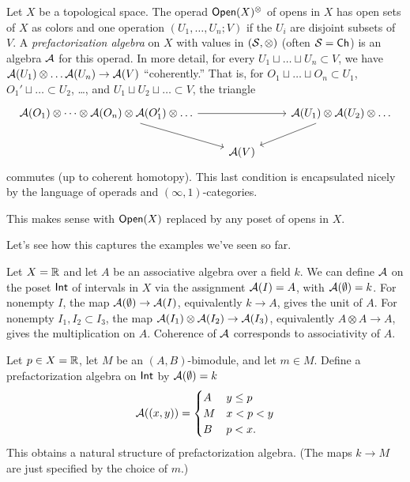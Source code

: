 \begin{dfn}
	Let $X$ be a topological space.
	The operad $\mathsf{Open}(X)^{\otimes}$ of opens in $X$ has open sets of $X$ as colors and one operation $(U_1, \dots, U_n; V)$ if the $U_i$ are disjoint subsets of $V$.
	A \emph{prefactorization algebra} on $X$ with values in $(\mathcal{S}, \otimes)$ (often $\mathcal{S} = \mathsf{Ch}$) is an algebra $\mathcal{A}$ for this operad.
	In more detail, for every $U_1 \sqcup \dots \sqcup U_n \subset V$, we have $\mathcal{A}(U_1) \otimes \dots \mathcal{A}(U_n) \to \mathcal{A}(V)$ ``coherently.''
	That is, for $O_1 \sqcup \dots \sqcup O_n \subset U_1$, $O_1' \sqcup \dots \subset U_2$, \dots, and $U_1 \sqcup U_2 \sqcup \dots \subset V$, the triangle
	\[
		\begin{tikzcd}
			\Ac(O_1) \otimes \dots \otimes \Ac(O_n) \otimes \Ac(O_1') \otimes \dots \ar[rr] \ar[dr] & & \Ac(U_1) \otimes \Ac(U_2) \otimes \dots \ar[dl] \\
														& \Ac(V) &
		\end{tikzcd}
	\]
	commutes (up to coherent homotopy).
	This last condition is encapsulated nicely by the language of operads and $(\infty, 1)$-categories.
\end{dfn}

\begin{rmk}
	This makes sense with $\mathsf{Open}(X)$ replaced by any poset of opens in $X$.
\end{rmk}

Let's see how this captures the examples we've seen so far.

\begin{ex}
	Let $X = \mathbb{R}$ and let $A$ be an associative algebra over a field $k$.
	We can define $\mathcal{A}$ on the poset $\mathsf{Int}$ of intervals in $X$ via the assignment $\mathcal{A}(I) = A$, with $\mathcal{A}(\emptyset) = k$.
	For nonempty $I$, the map $\mathcal{A}(\emptyset) \to \mathcal{A}(I)$, equivalently $k \to A$, gives the unit of $A$.
	For nonempty $I_1, I_2 \subset I_3$, the map $\mathcal{A}(I_1) \otimes \mathcal{A}(I_2) \to \mathcal{A}(I_3)$, equivalently $A \otimes A \to A$, gives the multiplication on $A$.
	Coherence of $\mathcal{A}$ corresponds to associativity of $A$.
\end{ex}

\begin{ex}
	Let $p \in X = \mathbb{R}$, let $M$ be an $(A, B)$-bimodule, and let $m \in M$.
	Define a prefactorization algebra on $\mathsf{Int}$ by $\mathcal{A}(\emptyset) = k$
	\[
		\mathcal{A}((x, y)) = \begin{cases}
			A & y \leq p \\
			M & x < p < y \\
			B & p < x.
		\end{cases}
	\]
	This obtains a natural structure of prefactorization algebra.
	(The maps $k \to M$ are just specified by the choice of $m$.)
\end{ex}

